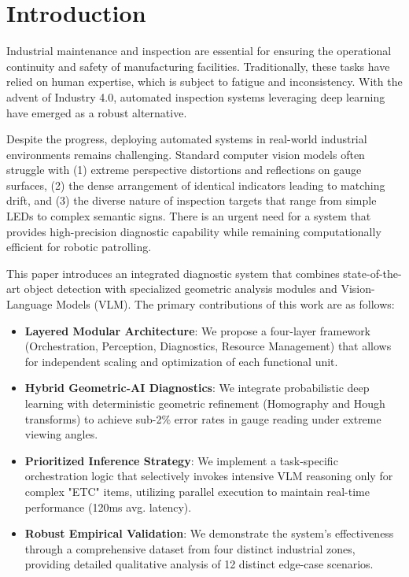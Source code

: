 \section{Introduction}
\label{sec:introduction}
Industrial maintenance and inspection are essential for ensuring the operational continuity and safety of manufacturing facilities. Traditionally, these tasks have relied on human expertise, which is subject to fatigue and inconsistency. With the advent of Industry 4.0, automated inspection systems leveraging deep learning have emerged as a robust alternative. 

Despite the progress, deploying automated systems in real-world industrial environments remains challenging. Standard computer vision models often struggle with (1) extreme perspective distortions and reflections on gauge surfaces, (2) the dense arrangement of identical indicators leading to matching drift, and (3) the diverse nature of inspection targets that range from simple LEDs to complex semantic signs. There is an urgent need for a system that provides high-precision diagnostic capability while remaining computationally efficient for robotic patrolling.

This paper introduces an integrated diagnostic system that combines state-of-the-art object detection with specialized geometric analysis modules and Vision-Language Models (VLM). The primary contributions of this work are as follows:
\begin{itemize}
    \item \textbf{Layered Modular Architecture}: We propose a four-layer framework (Orchestration, Perception, Diagnostics, Resource Management) that allows for independent scaling and optimization of each functional unit.
    \item \textbf{Hybrid Geometric-AI Diagnostics}: We integrate probabilistic deep learning with deterministic geometric refinement (Homography and Hough transforms) to achieve sub-2\% error rates in gauge reading under extreme viewing angles.
    \item \textbf{Prioritized Inference Strategy}: We implement a task-specific orchestration logic that selectively invokes intensive VLM reasoning only for complex "ETC" items, utilizing parallel execution to maintain real-time performance (120ms avg. latency).
    \item \textbf{Robust Empirical Validation}: We demonstrate the system's effectiveness through a comprehensive dataset from four distinct industrial zones, providing detailed qualitative analysis of 12 distinct edge-case scenarios.
\end{itemize}
